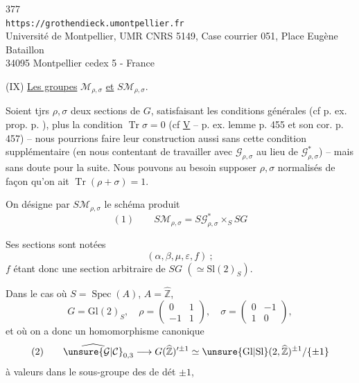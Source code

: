 
\begin{center}
377\\
\texttt{https://grothendieck.umontpellier.fr}\\
Université de Montpellier, UMR CNRS 5149, Case courrier 051, Place Eugène Bataillon\\
34095 Montpellier cedex 5 - France
\end{center}


(IX) \uline{Les groupes} $\mathcal{M}_{\rho,\sigma}$ \uline{et}
$S\mathcal{M}_{\rho,\sigma}$.

Soient tjrs $\rho,\sigma$ deux sections de $G$, satisfaisant les
conditions générales (cf p. ex. prop. p. ), plus la
condition $\operatorname{Tr}\sigma=0$ (cf \uline{V} -- p. ex. lemme
p. 455 et son cor. p. 457) -- nous pourrions faire leur construction
aussi sans cette condition supplémentaire (en nous contentant de
travailler avec $\mathcal{G}_{\rho,\sigma}$ au lieu de
$\mathcal{G}_{\rho,\sigma}^{*}$) -- mais 
sans doute pour la suite. Nous pouvons au besoin supposer
$\rho,\sigma$ normalisés de façon qu'on ait
$\operatorname{Tr}(\rho+\sigma)=1$.

On désigne par $S\mathcal{M}_{\rho,\sigma}$ le schéma produit
\[
(1)\qquad S\mathcal{M}_{\rho,\sigma}
=S\mathcal{G}_{\rho,\sigma}^{*}\times_S SG
\]

Ses sections sont notées
\[
(\alpha,\beta,\mu,\varepsilon,f)\ ;
\]
$f$ étant donc une section arbitraire de $SG$
$(\simeq\mathrm{Sl}(2)_S)$.

Dans le cas où $S=\operatorname{Spec}(A)$, $A=\widehat{\mathbb{Z}}$,
\[
G=\mathrm{Gl}(2)_S,\quad
\rho=\begin{pmatrix}0&1\\-1&1\end{pmatrix},\quad
\sigma=\begin{pmatrix}0&-1\\1&0\end{pmatrix},
\]
et où on a donc un homomorphisme canonique
\[
(2)\qquad
\widehat{\unsure{\mathcal{G}|\mathcal{C}}}_{0,3}
\longrightarrow
G(\widehat{\mathbb{Z}})^{\prime\pm1}
\simeq\unsure{\mathrm{Gl}|\mathrm{Sl}}(2,\widehat{\mathbb{Z}})^{\pm1}/\{\pm1\}
\]
à valeurs dans le sous-groupe des  de dét
$\pm1$,

